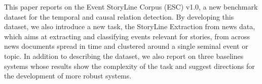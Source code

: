 This paper reports on the Event StoryLine Corpus (ESC) v1.0, a new benchmark dataset for the temporal and causal relation detection. By developing this dataset, we also introduce a new task, the StoryLine Extraction from news data, which aims at extracting and classifying events relevant for stories, from across news documents spread in time and clustered around a single seminal event or topic. In addition to describing the dataset, we also report on three baselines systems whose results show the complexity of the task and suggest directions for the development of more robust systems.
